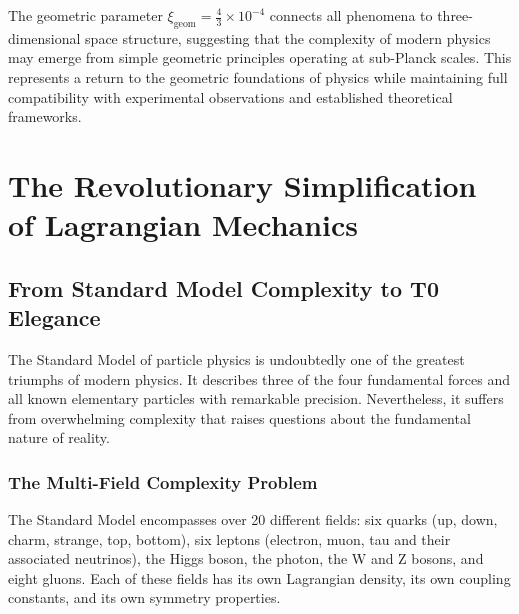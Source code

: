 \documentclass[12pt,a4paper]{report}
\newcommand{\xigeom}{\xi_{\text{geom}}}   %
\begin{document}
	The geometric parameter $\xigeom = \frac{4}{3} \times 10^{-4}$ connects all phenomena to three-dimensional space structure, suggesting that the complexity of modern physics may emerge from simple geometric principles operating at sub-Planck scales. This represents a return to the geometric foundations of physics while maintaining full compatibility with experimental observations and established theoretical frameworks.
	
	\chapter{The Revolutionary Simplification of Lagrangian Mechanics}
	\label{chap:lagrange}
	
	\section{From Standard Model Complexity to T0 Elegance}
	
	The Standard Model of particle physics is undoubtedly one of the greatest triumphs of modern physics. It describes three of the four fundamental forces and all known elementary particles with remarkable precision. Nevertheless, it suffers from overwhelming complexity that raises questions about the fundamental nature of reality.
	
	\subsection{The Multi-Field Complexity Problem}
	
	The Standard Model encompasses over 20 different fields: six quarks (up, down, charm, strange, top, bottom), six leptons (electron, muon, tau and their associated neutrinos), the Higgs boson, the photon, the W and Z bosons, and eight gluons. Each of these fields has its own Lagrangian density, its own coupling constants, and its own symmetry properties.
	
\end{document}
